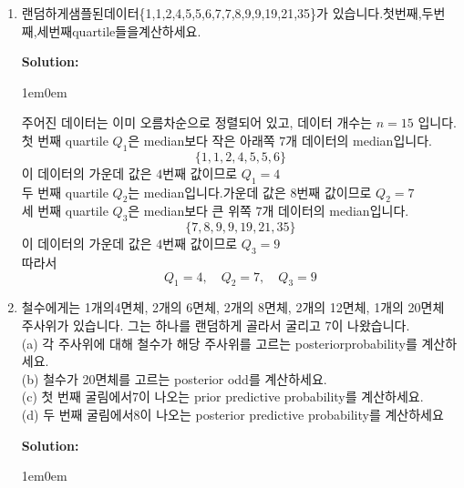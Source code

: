 \documentclass{article}
\newenvironment{solution}
{
    \par\medskip
    \noindent\textbf{Solution:}
    \begin{adjustwidth}{1em}{0em}
}
{
    \end{adjustwidth}
    \medskip
}
\begin{document}
\begin{enumerate}[label=\textbf{\arabic*.}, leftmargin=*]
\item 랜덤하게샘플된데이터\{1,1,2,4,5,5,6,7,7,8,9,9,19,21,35\}가 있습니다.첫번째,두번째,세번째quartile들을계산하세요.

    \begin{solution}
        주어진 데이터는 이미 오름차순으로 정렬되어 있고, 데이터 개수는 $n=15$ 입니다.  \\
        첫 번째 quartile $Q_1$은 median보다 작은 아래쪽 $7$개 데이터의 median입니다.  
        $$  
        \{1,1,2,4,5,5,6\}  
        $$  
        이 데이터의 가운데 값은 $4$번째 값이므로 $ Q_1=4$ \\
        두 번째 quartile $Q_2$는 median입니다.가운데 값은 $8$번째 값이므로 $Q_2=7$\\ 
        세 번째 quartile $Q_3$은 median보다 큰 위쪽 $7$개 데이터의 median입니다.  
        $$  
        \{7,8,9,9,19,21,35\}  
        $$  
        이 데이터의 가운데 값은 $4$번째 값이므로 $Q_3=9$  \\
        따라서  
        $$  
        Q_1=4,\quad Q_2=7,\quad Q_3=9  
        $$
    \end{solution}

\item 철수에게는 1개의4면체, 2개의 6면체, 2개의 8면체, 2개의 12면체, 1개의 20면체 주사위가 있습니다. 그는 하나를 랜덤하게 골라서 굴리고 7이 나왔습니다.\\
(a) 각 주사위에 대해 철수가 해당 주사위를 고르는 posteriorprobability를 계산하세요.\\
(b) 철수가 20면체를 고르는 posterior odd를 계산하세요.\\
(c) 첫 번째 굴림에서7이 나오는 prior predictive probability를 계산하세요.\\
(d) 두 번째 굴림에서8이 나오는 posterior predictive probability를 계산하세요

    \begin{solution}
        \begin{enumerate}[label=(\alph*), leftmargin=2em, itemsep=1em]
            

\end{enumerate}
\end{solution}
\end{enumerate}
\end{document}
